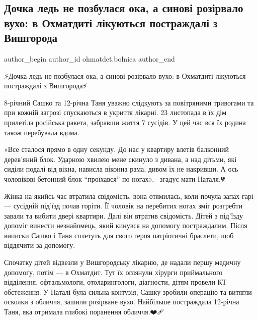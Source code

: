  
 
 
 
 
 
\subsection{Дочка ледь не позбулася ока, а синові розірвало вухо: в Охматдиті лікуються постраждалі з Вишгорода}
\label{sec:09_12_2022.fb.ohmatdet.bolnica.1.vyshgorod}
 
\ifcmt
 author_begin
   author_id ohmatdet.bolnica
 author_end
\fi

⚡️Дочка ледь не позбулася ока, а синові розірвало вухо: в Охматдиті лікуються постраждалі з Вишгорода⚡️

8-річний Сашко та 12-річна Таня уважно слідкують за повітряними тривогами та
при кожній загрозі спускаються в укриття лікарні. 23 листопада в їх дім
прилетіла російська ракета, забравши життя 7 сусідів. У цей час вся їх родина
також перебувала вдома.

«Все сталося прямо в одну секунду. До нас у квартиру влетів балконний
дерев'яний блок. Ударною хвилею мене скинуло з дивана, а над дітьми, які сиділи
подалі від вікна, нависла віконна рама, дивом їх не накривши. А ось чоловікові
бетонний блок \enquote{проїхався} по ногах»,– згадує мати Наталя.💔

Жінка на якийсь час втратила свідомість, вона отямилась, коли почула запах гарі
— сусідній під'їзд почав горіти. Її чоловік на перебитих ногах зміг розгребти
завали та вибити двері квартири. Далі він втратив свідомість. Дітей з під'їзду
допоміг винести незнайомець, який кинувся на допомогу постраждалим. Після
виписки Сашко і Таня сплетуть для свого героя патріотичні браслети, щоб
віддячити за допомогу.🙏🏻

Спочатку дітей відвезли у Вишгородську лікарню, де надали першу медичну
допомогу, потім — в Охматдит. Тут їх оглянули хірурги приймального відділення,
офтальмологи, отоларингологи, діагности, дітям провели КТ обстеження. У Наталі
була сильна контузія, Сашку зробили операцію та витягли осколки з обличчя,
зашили розірване вухо. Найбільше постраждала 12-річна Таня, яка отримала
глибокі поранення обличчя.❤️🩹

